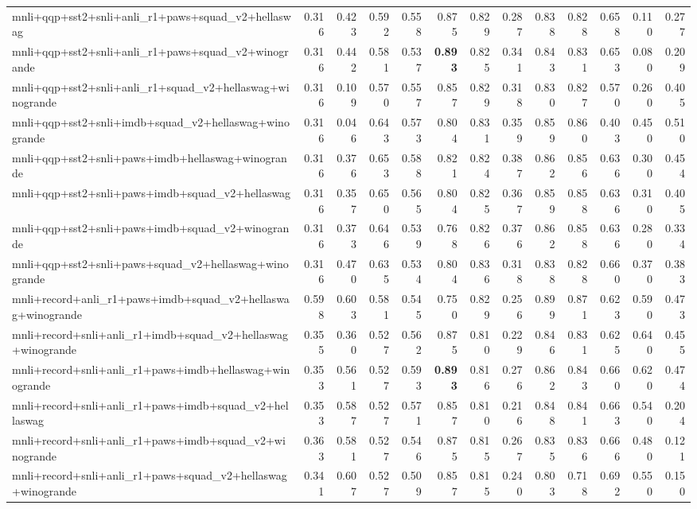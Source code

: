 \begin{table}[t]
\begin{tabular}{lrrrrrrrrrrrr}
    mnli+qqp+sst2+snli+anli\_r1+paws+squad\_v2+hellaswag & 0.316 & 0.423 & 0.592 & 0.558 & 0.875 & 0.829 & 0.287 & 0.838 & 0.828 & 0.658 & 0.110 & 0.277 \\
    mnli+qqp+sst2+snli+anli\_r1+paws+squad\_v2+winogrande & 0.316 & 0.442 & 0.581 & 0.537 & \textbf{0.893} & 0.825 & 0.341 & 0.843 & 0.831 & 0.653 & 0.080 & 0.209 \\
    mnli+qqp+sst2+snli+anli\_r1+squad\_v2+hellaswag+winogrande & 0.316 & 0.109 & 0.570 & 0.557 & 0.857 & 0.829 & 0.318 & 0.830 & 0.827 & 0.570 & 0.260 & 0.405 \\
    mnli+qqp+sst2+snli+imdb+squad\_v2+hellaswag+winogrande & 0.316 & 0.046 & 0.643 & 0.573 & 0.804 & 0.831 & 0.359 & 0.859 & 0.860 & 0.403 & 0.450 & 0.510 \\
    mnli+qqp+sst2+snli+paws+imdb+hellaswag+winogrande & 0.316 & 0.376 & 0.653 & 0.588 & 0.821 & 0.824 & 0.387 & 0.862 & 0.856 & 0.636 & 0.300 & 0.454 \\
    mnli+qqp+sst2+snli+paws+imdb+squad\_v2+hellaswag & 0.316 & 0.357 & 0.650 & 0.565 & 0.804 & 0.825 & 0.367 & 0.859 & 0.858 & 0.636 & 0.310 & 0.405 \\
    mnli+qqp+sst2+snli+paws+imdb+squad\_v2+winogrande & 0.316 & 0.373 & 0.646 & 0.539 & 0.768 & 0.826 & 0.376 & 0.862 & 0.858 & 0.636 & 0.280 & 0.334 \\
    mnli+qqp+sst2+snli+paws+squad\_v2+hellaswag+winogrande & 0.316 & 0.470 & 0.635 & 0.534 & 0.804 & 0.836 & 0.318 & 0.838 & 0.828 & 0.660 & 0.370 & 0.383 \\
    mnli+record+anli\_r1+paws+imdb+squad\_v2+hellaswag+winogrande & 0.598 & 0.603 & 0.581 & 0.545 & 0.750 & 0.829 & 0.256 & 0.899 & 0.871 & 0.623 & 0.590 & 0.473 \\
    mnli+record+snli+anli\_r1+imdb+squad\_v2+hellaswag+winogrande & 0.355 & 0.360 & 0.527 & 0.562 & 0.875 & 0.810 & 0.229 & 0.846 & 0.831 & 0.625 & 0.640 & 0.455 \\
    mnli+record+snli+anli\_r1+paws+imdb+hellaswag+winogrande & 0.353 & 0.561 & 0.527 & 0.593 & \textbf{0.893} & 0.816 & 0.276 & 0.862 & 0.843 & 0.660 & 0.620 & 0.474 \\
    mnli+record+snli+anli\_r1+paws+imdb+squad\_v2+hellaswag & 0.353 & 0.587 & 0.527 & 0.571 & 0.857 & 0.810 & 0.216 & 0.848 & 0.841 & 0.663 & 0.540 & 0.204 \\
    mnli+record+snli+anli\_r1+paws+imdb+squad\_v2+winogrande & 0.363 & 0.581 & 0.527 & 0.546 & 0.875 & 0.815 & 0.267 & 0.835 & 0.836 & 0.666 & 0.480 & 0.121 \\
    mnli+record+snli+anli\_r1+paws+squad\_v2+hellaswag+winogrande & 0.341 & 0.607 & 0.527 & 0.509 & 0.857 & 0.815 & 0.240 & 0.803 & 0.718 & 0.692 & 0.550 & 0.150 \\

\end{tabular}
\end{table}

